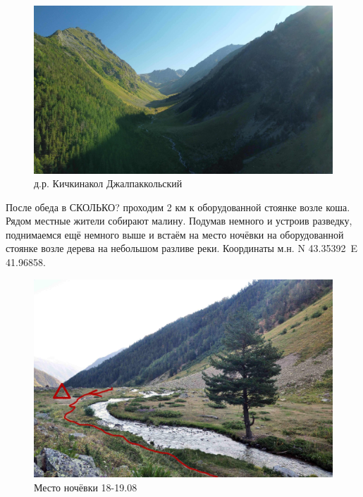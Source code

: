 \begin{figure}[h]
	\centering
	\includegraphics[width=0.7\linewidth]{../pics/DJI_0805}
	\caption{д.р. Кичкинакол Джалпаккольский}
	\label{fig:kichkinakol}
\end{figure}

После обеда в \alert{СКОЛЬКО?} проходим 2 км к оборудованной стоянке возле коша. Рядом местные жители собирают малину. Подумав немного и устроив разведку, поднимаемся ещё немного выше и встаём на место ночёвки на оборудованной стоянке возле дерева на небольшом разливе реки. Координаты м.н. N 43.35392\degree~E 41.96858\degree.
\begin{figure}[h]
	\centering
	\includegraphics[width=0.7\linewidth]{../pics/camp_18}
	\caption{Место ночёвки 18-19.08}
	\label{fig:camp_18}
\end{figure}


\newpage
